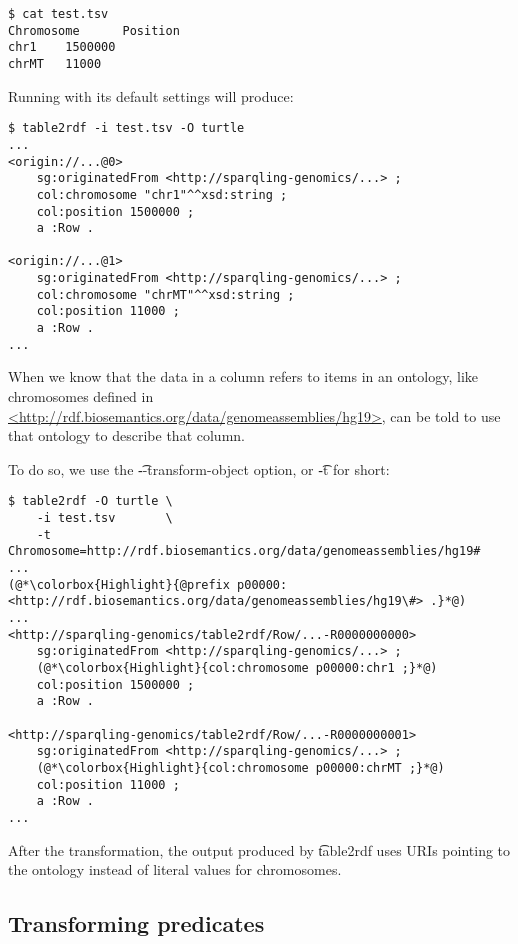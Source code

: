 \begin{lstlisting}
$ cat test.tsv
Chromosome      Position
chr1    1500000
chrMT   11000
\end{lstlisting}

  Running  with its default settings will produce:

\begin{lstlisting}
$ table2rdf -i test.tsv -O turtle
...
<origin://...@0>
    sg:originatedFrom <http://sparqling-genomics/...> ;
    col:chromosome "chr1"^^xsd:string ;
    col:position 1500000 ;
    a :Row .

<origin://...@1>
    sg:originatedFrom <http://sparqling-genomics/...> ;
    col:chromosome "chrMT"^^xsd:string ;
    col:position 11000 ;
    a :Row .
...
\end{lstlisting}

  \begin{sloppypar}
  When we know that the data in a column refers to items in an ontology, like
  chromosomes defined in
  \href{http://rdf.biosemantics.org/data/genomeassemblies/hg19}%
  {<http://rdf.biosemantics.org/data/genomeassemblies/hg19>}, 
  can be told to use that ontology to describe that column.
  \end{sloppypar}

  To do so, we use the \t{-{}-transform-object} option, or \t{-t}
  for short:

\begin{lstlisting}
$ table2rdf -O turtle \
    -i test.tsv       \
    -t Chromosome=http://rdf.biosemantics.org/data/genomeassemblies/hg19#
...
(@*\colorbox{Highlight}{@prefix p00000: <http://rdf.biosemantics.org/data/genomeassemblies/hg19\#> .}*@)
...
<http://sparqling-genomics/table2rdf/Row/...-R0000000000>
    sg:originatedFrom <http://sparqling-genomics/...> ;
    (@*\colorbox{Highlight}{col:chromosome p00000:chr1 ;}*@)
    col:position 1500000 ;
    a :Row .

<http://sparqling-genomics/table2rdf/Row/...-R0000000001>
    sg:originatedFrom <http://sparqling-genomics/...> ;
    (@*\colorbox{Highlight}{col:chromosome p00000:chrMT ;}*@)
    col:position 11000 ;
    a :Row .
...
\end{lstlisting}

  After the transformation, the output produced by \t{table2rdf} uses
  URIs pointing to the ontology instead of literal values for chromosomes.

\subsection{Transforming predicates}

